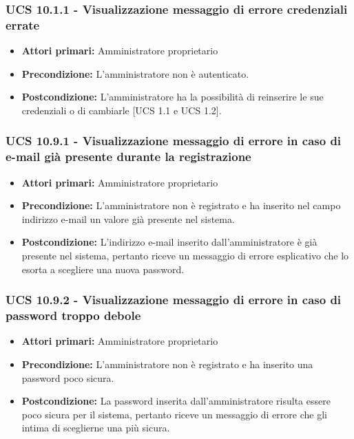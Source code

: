 \subsubsection{UCS 10.1.1 - Visualizzazione messaggio di errore credenziali errate}%
\begin{itemize}
\item \textbf{Attori primari:} Amministratore proprietario
\item \textbf{Precondizione:} L'amministratore non è autenticato.
\item \textbf{Postcondizione:} L'amministratore ha la possibilità di reinserire le sue credenziali o di cambiarle [UCS 1.1 e UCS 1.2].
\end{itemize}

\subsubsection{UCS 10.9.1 - Visualizzazione messaggio di errore in caso di e-mail già presente durante la registrazione}%
\begin{itemize}
    \item \textbf{Attori primari:} Amministratore proprietario
    \item \textbf{Precondizione:} L'amministratore non è registrato e ha inserito nel campo indirizzo e-mail un valore già presente nel sistema.
    \item \textbf{Postcondizione:} L'indirizzo e-mail inserito dall'amministratore è già presente nel sistema, pertanto riceve un messaggio di errore esplicativo che lo esorta a scegliere una nuova password.
\end{itemize}

\subsubsection{UCS 10.9.2 - Visualizzazione messaggio di errore in caso di password troppo debole}%
\begin{itemize}
\item \textbf{Attori primari:} Amministratore proprietario
\item \textbf{Precondizione:} L'amministratore non è registrato e ha inserito una password poco sicura.
\item \textbf{Postcondizione:} La password inserita dall'amministratore risulta essere poco sicura per il sistema, pertanto riceve un messaggio di errore che gli intima di sceglierne una più sicura.
\end{itemize}

